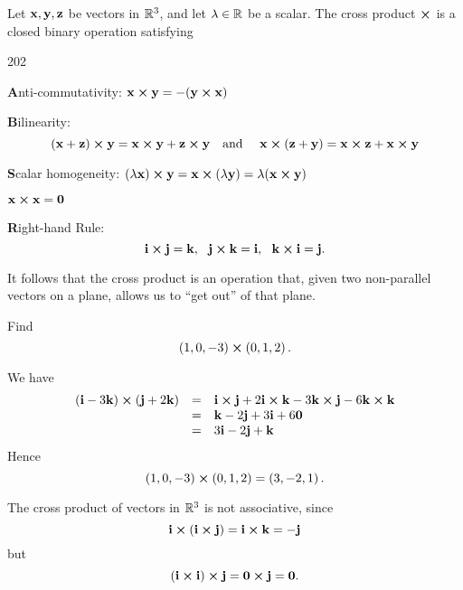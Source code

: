 \begin{df} Let $\mathbf{ x}, \mathbf{ y}, \mathbf{ z}$ be vectors in $\mathbb{R}^3$, and let  $\lambda \in
\mathbb{R}$ be a scalar. The cross  product $\boldsymbol\times$ is a closed binary
operation satisfying
\begin{dingautolist}{202}
\item {\textbf  Anti-commutativity:} $\mathbf{  x} \boldsymbol\times\mathbf{ 
y} = -(\mathbf{  y} \boldsymbol\times\mathbf{  x})$ \item {\textbf
Bilinearity:} $$(\mathbf{  x} + \mathbf{ z}) \boldsymbol\times\mathbf{  y} =
\mathbf{  x} \boldsymbol\times\mathbf{  y} + \mathbf{ z} \boldsymbol\times\mathbf{ 
y} \ \ \ \mathrm{and} \ \ \ \ \mathbf{  x} \boldsymbol\times ( \mathbf{ z}  +
\mathbf{  y}) = \mathbf{  x} \boldsymbol\times\mathbf{ z} + \mathbf{  x}
\boldsymbol\times\mathbf{  y}$$ \item {\textbf  Scalar homogeneity:}
$(\lambda\mathbf{  x}) \boldsymbol\times\mathbf{  y} = \mathbf{  x} \boldsymbol\times
(\lambda \mathbf{  y}) = \lambda(\mathbf{  x} \boldsymbol\times\mathbf{ 
y})$ \item $\mathbf{  x} \boldsymbol\times\mathbf{  x} = \mathbf{ { 0}}$
\item {\textbf  Right-hand Rule:}
$$\mathbf{ i}\boldsymbol\times\mathbf{ j} = \mathbf{ k}, \ \
\mathbf{ j}\boldsymbol\times\mathbf{ k} = \mathbf{ i}, \ \ \mathbf{ k}\boldsymbol\times\mathbf{ i} = \mathbf{ j}.$$
\end{dingautolist}
\end{df}

It follows that the cross product is an operation that, given two
non-parallel vectors on a plane, allows us to ``get out'' of that
plane.

\begin{exa}
Find $$ \left( 1 , 0 , -3 \right) \boldsymbol\times \left( 0 , 1 , 2 \right).$$
 \label{exa:wedge1}\end{exa}
\begin{solu} We have
$$\begin{array}{lll}
(\mathbf{ i} - 3\mathbf{ k}) \boldsymbol\times (\mathbf{ j} + 2\mathbf{ k}) & = &
\mathbf{ i}\boldsymbol\times\mathbf{ j} + 2\mathbf{ i}\boldsymbol\times\mathbf{ k} - 3\mathbf{ k}\boldsymbol\times\mathbf{ j} -
6\mathbf{ k}\boldsymbol\times\mathbf{ k}\\
& = & \mathbf{ k} - 2 \mathbf{ j} + 3 \mathbf{ i} + 6\mathbf{ 0} \\
& = & 3\mathbf{ i} - 2\mathbf{ j} + \mathbf{ k}
\end{array}$$
Hence $$ \left( 1 , 0 , -3 \right) \boldsymbol\times \left( 0 , 1 , 2 \right) =
\left( 3 , -2 ,  1 \right).$$

\end{solu}
\begin{rem}
The cross product of vectors in $\mathbb{R}^3$ is not associative, since
$$\mathbf{ i}\boldsymbol\times (\mathbf{ i}\boldsymbol\times\mathbf{ j}) = \mathbf{ i}\boldsymbol\times\mathbf{ k} =
-\mathbf{ j}$$ but $$(\mathbf{ i}\boldsymbol\times\mathbf{ i})\boldsymbol\times\mathbf{ j} =
\mathbf{ 0}\boldsymbol\times\mathbf{ j} = \mathbf{ { 0}}.$$
\end{rem}


